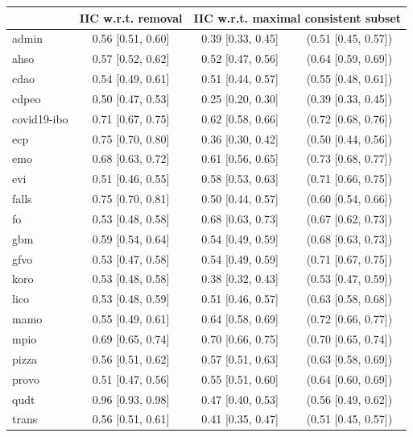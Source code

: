 \begin{table}[ht]
  \scriptsize
  \centering
  \begin{tabular}{|l|cc@{ }c|}
    \cline{2-4}
    \multicolumn{1}{l|}{} & IIC w.r.t. removal & \multicolumn{2}{c|}{IIC w.r.t. maximal consistent subset} \\
    \hline
    admin & 0.56 [0.51, 0.60] & 0.39 [0.33, 0.45] & (0.51 [0.45, 0.57]) \\
    ahso & 0.57 [0.52, 0.62] & 0.52 [0.47, 0.56] & (0.64 [0.59, 0.69]) \\
    cdao & 0.54 [0.49, 0.61] & 0.51 [0.44, 0.57] & (0.55 [0.48, 0.61]) \\
    cdpeo & 0.50 [0.47, 0.53] & 0.25 [0.20, 0.30] & (0.39 [0.33, 0.45]) \\
    covid19-ibo & 0.71 [0.67, 0.75] & 0.62 [0.58, 0.66] & (0.72 [0.68, 0.76]) \\
    ecp & 0.75 [0.70, 0.80] & 0.36 [0.30, 0.42] & (0.50 [0.44, 0.56]) \\
    emo & 0.68 [0.63, 0.72] & 0.61 [0.56, 0.65] & (0.73 [0.68, 0.77]) \\
    evi & 0.51 [0.46, 0.55] & 0.58 [0.53, 0.63] & (0.71 [0.66, 0.75]) \\
    falls & 0.75 [0.70, 0.81] & 0.50 [0.44, 0.57] & (0.60 [0.54, 0.66]) \\
    fo & 0.53 [0.48, 0.58] & 0.68 [0.63, 0.73] & (0.67 [0.62, 0.73]) \\
    gbm & 0.59 [0.54, 0.64] & 0.54 [0.49, 0.59] & (0.68 [0.63, 0.73]) \\
    gfvo & 0.53 [0.47, 0.58] & 0.54 [0.49, 0.59] & (0.71 [0.67, 0.75]) \\
    koro & 0.53 [0.48, 0.58] & 0.38 [0.32, 0.43] & (0.53 [0.47, 0.59]) \\
    lico & 0.53 [0.48, 0.59] & 0.51 [0.46, 0.57] & (0.63 [0.58, 0.68]) \\
    mamo & 0.55 [0.49, 0.61] & 0.64 [0.58, 0.69] & (0.72 [0.66, 0.77]) \\
    mpio & 0.69 [0.65, 0.74] & 0.70 [0.66, 0.75] & (0.70 [0.65, 0.74]) \\
    pizza & 0.56 [0.51, 0.62] & 0.57 [0.51, 0.63] & (0.63 [0.58, 0.69]) \\
    provo & 0.51 [0.47, 0.56] & 0.55 [0.51, 0.60] & (0.64 [0.60, 0.69]) \\
    qudt & 0.96 [0.93, 0.98] & 0.47 [0.40, 0.53] & (0.56 [0.49, 0.62]) \\
    trans & 0.56 [0.51, 0.61] & 0.41 [0.35, 0.47] & (0.51 [0.45, 0.57]) \\

\end{tabular}
\end{table}
